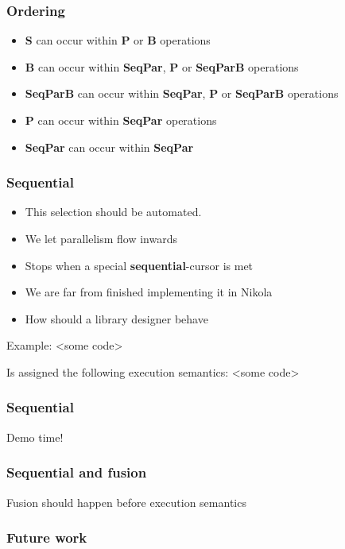 \documentclass{beamer}
\begin{document}
\begin{frame}
  \frametitle{Ordering}
  \begin{itemize}
  \item \textbf{S} can occur within \textbf{P} or \textbf{B} operations
  \item \textbf{B} can occur within \textbf{SeqPar}, \textbf{P} or \textbf{SeqParB} operations
  \item \textbf{SeqParB} can occur within \textbf{SeqPar}, \textbf{P} or \textbf{SeqParB} operations
  \item \textbf{P} can occur within \textbf{SeqPar} operations
  \item \textbf{SeqPar} can occur within \textbf{SeqPar} 
  \end{itemize}
\end{frame}

\begin{frame}
  \frametitle{Sequential}

  \begin{itemize}
  \item This selection should be automated.
  \item We let parallelism flow inwards
  \item Stops when a special \textbf{sequential}-cursor is met
  \item We are far from finished implementing it in Nikola
  \item How should a library designer behave
  \end{itemize}

  Example:  <some code>

  Is assigned the following execution semantics: <some code>

\end{frame}

\begin{frame}
  \frametitle{Sequential}
  \begin{center}
    {\Large Demo time! }
  \end{center}
\end{frame}


\begin{frame}
  \frametitle{Sequential and fusion}
  Fusion should happen before execution semantics
\end{frame}

\begin{frame}
  \frametitle{Future work}
\end{frame}
\end{document}
